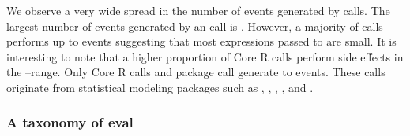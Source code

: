 \documentclass[USenglish,cleveref, autoref, thm-restate]{lipics-v2019}
\begin{document}
\begin{table}[ht] \label{table:event-distribution}
  \caption{Events in \eval calls}
\end{table}

We observe a very wide spread in the number of events generated by \eval
calls. The largest number of events generated by an \eval call is
\EventsMaxCountRnd.  However, a majority of \eval calls performs up to
\EventsMaxRangeA events suggesting that most expressions passed to \eval are
small.  It is interesting to note that a higher proportion of Core R \eval
calls perform side effects in the \EventsMinRangeB--\EventsMaxRangeB range.
Only \EventsCoreEvalCountC Core R \eval calls and \EventsPackageEvalCountC
package \eval call generate \EventsMinRangeC to \EventsMaxRangeC events.
These \eval calls originate from statistical modeling packages such as
\mlogit, \mboost, \metafor, \lavaan, \mclust and \gamlss.


\subsubsection{A taxonomy of eval}

\end{document}
